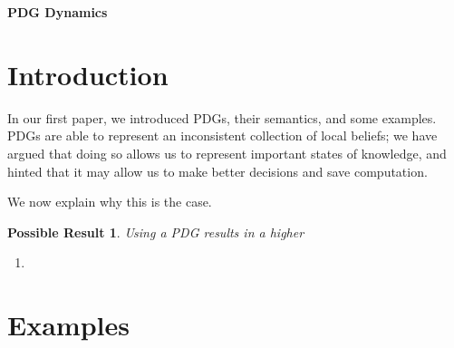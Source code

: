 \documentclass{article}
\theoremstyle{plain}
\newtheorem{poss}{Possible Result}
\theoremstyle{definition}
\begin{document}
\begin{center}
	{\bfseries\Large PDG Dynamics}
\end{center}	
	
\section{Introduction}
In our first paper, we introduced PDGs, their semantics, and some examples. 
PDGs are able to represent an inconsistent collection of local beliefs; we have argued that doing so allows us to represent important states of knowledge, and hinted that it may allow us to make better decisions and save computation. 

We now explain why this is the case. 


\begin{poss}
	Using a PDG results in a higher
\end{poss}



\begin{enumerate}
	\item 
\end{enumerate}


\section{Examples}
\end{document}
